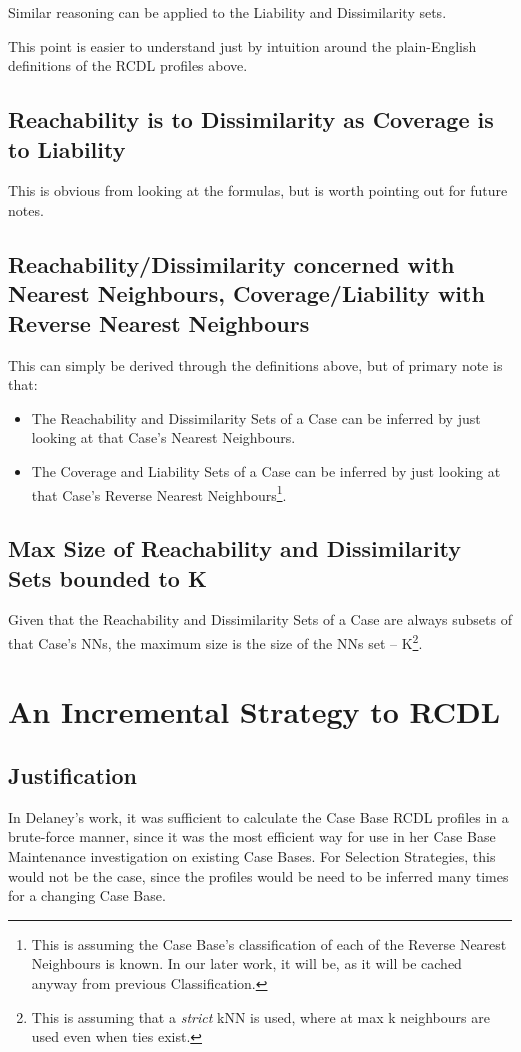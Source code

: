\documentclass[a4paper,11pt]{report}
\begin{document}
Similar reasoning can be applied to the Liability and Dissimilarity sets.

This point is easier to understand just by intuition around the plain-English definitions of the RCDL profiles above.

\subsection{Reachability is to Dissimilarity as Coverage is to Liability}
This is obvious from looking at the formulas, but is worth pointing out for future notes.

\subsection{Reachability/Dissimilarity concerned with Nearest Neighbours, Coverage/Liability with Reverse Nearest Neighbours \label{sec:RdWithNnClWithRnn}}
This can simply be derived through the definitions above, but of primary note is that:
\begin{itemize}
	\item The Reachability and Dissimilarity Sets of a Case can be inferred by just looking at that Case's Nearest Neighbours.
	\item The Coverage and Liability Sets of a Case can be inferred by just looking at that Case's Reverse Nearest Neighbours\footnote{This is assuming the Case Base's classification of each of the Reverse Nearest Neighbours is known. In our later work, it will be, as it will be cached anyway from previous Classification.}.
\end{itemize}

\subsection{Max Size of Reachability and Dissimilarity Sets bounded to K}
Given that the Reachability and Dissimilarity Sets of a Case are always subsets of that Case's NNs, the maximum size is the size of the NNs set – K\footnote{This is assuming that a \emph{strict} kNN is used, where at max k neighbours are used even when ties exist.}.

\section{An Incremental Strategy to RCDL}
\subsection{Justification} 
In Delaney's work, it was sufficient to calculate the Case Base RCDL profiles in a brute-force manner, since it was the most efficient way for use in her Case Base Maintenance investigation on existing Case Bases. For Selection Strategies, this would not be the case, since the profiles would be need to be inferred many times for a changing Case Base.
\end{document}
